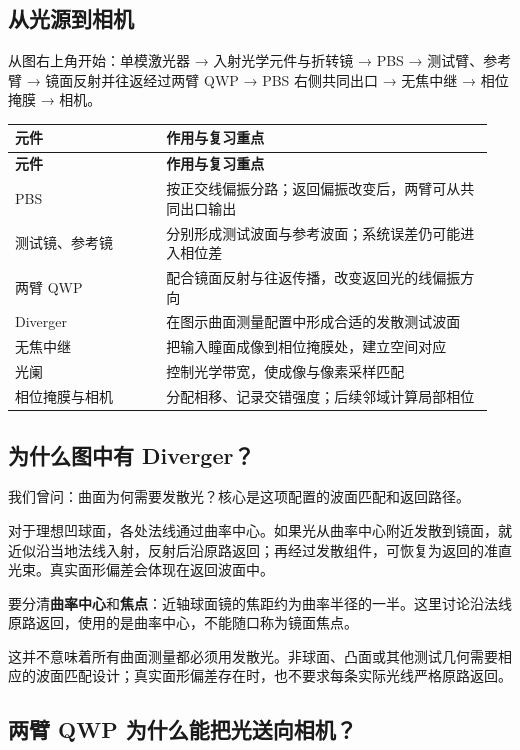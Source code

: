 \documentclass[UTF8,fontset=fandol,11pt,a4paper]{ctexart}
\begin{document}
\subsection{从光源到相机}

从图右上角开始：单模激光器 → 入射光学元件与折转镜 → PBS → 测试臂、参考臂 → 镜面反射并往返经过两臂 QWP → PBS 右侧共同出口 → 无焦中继 → 相位掩膜 → 相机。

{\small
\begin{longtable}{>{\raggedright\arraybackslash}p{0.3\linewidth}>{\raggedright\arraybackslash}p{0.65\linewidth}}
\toprule
\textbf{元件} & \textbf{作用与复习重点} \\
\midrule
\endfirsthead
\toprule
\textbf{元件} & \textbf{作用与复习重点} \\
\midrule
\endhead
PBS & 按正交线偏振分路；返回偏振改变后，两臂可从共同出口输出 \\
测试镜、参考镜 & 分别形成测试波面与参考波面；系统误差仍可能进入相位差 \\
两臂 QWP & 配合镜面反射与往返传播，改变返回光的线偏振方向 \\
Diverger & 在图示曲面测量配置中形成合适的发散测试波面 \\
无焦中继 & 把输入瞳面成像到相位掩膜处，建立空间对应 \\
光阑 & 控制光学带宽，使成像与像素采样匹配 \\
相位掩膜与相机 & 分配相移、记录交错强度；后续邻域计算局部相位 \\
\bottomrule
\end{longtable}
}

\subsection{为什么图中有 Diverger？}

我们曾问：曲面为何需要发散光？核心是这项配置的波面匹配和返回路径。

对于理想凹球面，各处法线通过曲率中心。如果光从曲率中心附近发散到镜面，就近似沿当地法线入射，反射后沿原路返回；再经过发散组件，可恢复为返回的准直光束。真实面形偏差会体现在返回波面中。

要分清\textbf{曲率中心}和\textbf{焦点}：近轴球面镜的焦距约为曲率半径的一半。这里讨论沿法线原路返回，使用的是曲率中心，不能随口称为镜面焦点。

这并不意味着所有曲面测量都必须用发散光。非球面、凸面或其他测试几何需要相应的波面匹配设计；真实面形偏差存在时，也不要求每条实际光线严格原路返回。

\subsection{两臂 QWP 为什么能把光送向相机？}
\end{document}
